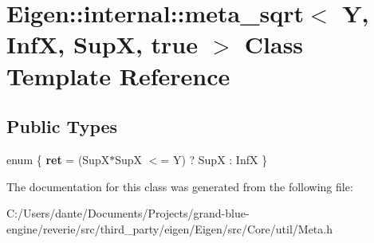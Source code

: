 \hypertarget{class_eigen_1_1internal_1_1meta__sqrt_3_01_y_00_01_inf_x_00_01_sup_x_00_01true_01_4}{}\section{Eigen\+::internal\+::meta\+\_\+sqrt$<$ Y, InfX, SupX, true $>$ Class Template Reference}
\label{class_eigen_1_1internal_1_1meta__sqrt_3_01_y_00_01_inf_x_00_01_sup_x_00_01true_01_4}
\subsection*{Public Types}
\begin{DoxyCompactItemize}
\item 
\mbox{\label{class_eigen_1_1internal_1_1meta__sqrt_3_01_y_00_01_inf_x_00_01_sup_x_00_01true_01_4_a51eb31df9a53dac90ad1b08ddccc5418}} 
enum \{ {\bfseries ret} = (Sup\+X$\ast$\+SupX $<$= Y) ? SupX \+: InfX
 \}
\end{DoxyCompactItemize}


The documentation for this class was generated from the following file\+:\begin{DoxyCompactItemize}
\item 
C\+:/\+Users/dante/\+Documents/\+Projects/grand-\/blue-\/engine/reverie/src/third\+\_\+party/eigen/\+Eigen/src/\+Core/util/Meta.\+h\end{DoxyCompactItemize}
